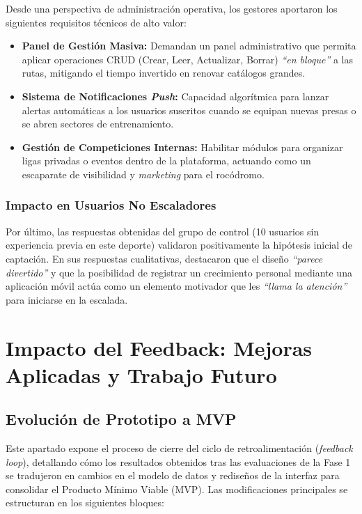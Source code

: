 Desde una perspectiva de administración operativa, los gestores aportaron los siguientes requisitos técnicos de alto valor:
\begin{itemize}
    \item \textbf{Panel de Gestión Masiva:} Demandan un panel administrativo que permita aplicar operaciones CRUD (Crear, Leer, Actualizar, Borrar) \textit{``en bloque''} a las rutas, mitigando el tiempo invertido en renovar catálogos grandes.
    \item \textbf{Sistema de Notificaciones \textit{Push}:} Capacidad algorítmica para lanzar alertas automáticas a los usuarios suscritos cuando se equipan nuevas presas o se abren sectores de entrenamiento.
    \item \textbf{Gestión de Competiciones Internas:} Habilitar módulos para organizar ligas privadas o eventos dentro de la plataforma, actuando como un escaparate de visibilidad y \textit{marketing} para el rocódromo.
\end{itemize}

\subsubsection{Impacto en Usuarios No Escaladores}
Por último, las respuestas obtenidas del grupo de control (10 usuarios sin experiencia previa en este deporte) validaron positivamente la hipótesis inicial de captación. En sus respuestas cualitativas, destacaron que el diseño \textit{``parece divertido''} y que la posibilidad de registrar un crecimiento personal mediante una aplicación móvil actúa como un elemento motivador que les \textit{``llama la atención''} para iniciarse en la escalada.

\section{Impacto del Feedback: Mejoras Aplicadas y Trabajo Futuro}

\subsection{Evolución de Prototipo a MVP}
Este apartado expone el proceso de cierre del ciclo de retroalimentación (\textit{feedback loop}), detallando cómo los resultados obtenidos tras las evaluaciones de la Fase 1 se tradujeron en cambios en el modelo de datos y rediseños de la interfaz para consolidar el Producto Mínimo Viable (MVP). Las modificaciones principales se estructuran en los siguientes bloques:

